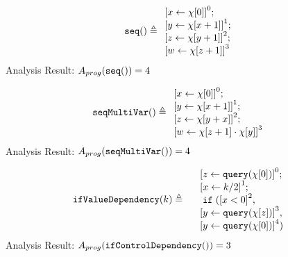     \begin{example}
        \[
            \kw{seq()} \triangleq 
        \begin{array}{l} 
               \clabel{ \assign{x}{\chi[0]}}^{0} ; \\
                \clabel{\assign{y}{\chi[x + 1]} }^{1} ; \\
                \clabel{\assign{z}{\chi[y + 1]}}^{2}; \\
                 \clabel{\assign{w}{\chi[z + 1]} }^{3}
            \end{array}
        \]
        Analysis Result: $ A_{{prog}}( \mathtt{seq()}) = 4$
        \end{example}
    \begin{example}
        \[
            \kw{seqMultiVar()} \triangleq 
        \begin{array}{l} 
               \clabel{ \assign{x}{\chi[0]}}^{0} ; \\
                \clabel{\assign{y}{\chi[x + 1]} }^{1} ; \\
                \clabel{\assign{z}{\chi[y + x]}}^{2}; \\
                 \clabel{\assign{w}{\chi[z + 1] \cdot \chi[y]} }^{3}
            \end{array}
        \]
        Analysis Result: $ A_{{prog}}(\mathtt{seqMultiVar()}) = 4$
    \end{example}
        \begin{example}
            \[
            \kw{ifValueDependency}(k) \triangleq 
            \begin{array}{l}
               \quad \clabel{ \assign{z}{\query(\chi[0])}}^{0} ; \\
               \quad \clabel{\assign{x}{k / 2} }^{1} ; \\
               \quad \eif(\clabel{x < 0}^2, \\
               \quad \clabel{\assign{y}{\query(\chi[z])}}^{3}, \\ 
               \quad \clabel{\assign{y}{\query(\chi[0])}}^{4})
                \end{array}
            \]
            Analysis Result: $ A_{{prog}}( \mathtt{ifControlDependency()}) = 3$
        \end{example}
    
